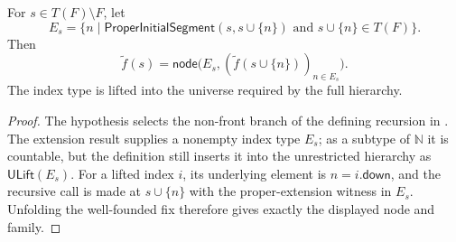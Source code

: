 \begin{lemma}
For $s\in T(F)\setminus F$, let
\[
 E_s=\{n\mid \mathsf{ProperInitialSegment}(s,s\cup\{n\})
                 \text{ and }s\cup\{n\}\in T(F)\}.
\]
Then
\[
 \widetilde f(s)=
 \mathsf{node}\bigl(E_s,(\widetilde f(s\cup\{n\}))_{n\in E_s}\bigr).
\]
The index type is lifted into the universe required by the full hierarchy.
\end{lemma}
\begin{proof}
The hypothesis selects the non-front branch of the defining recursion in
.  The extension result 
supplies a nonempty index type $E_s$; as a subtype of $\mathbb N$ it is
countable, but the definition still inserts it into the unrestricted
hierarchy as $\mathsf{ULift}(E_s)$.  For a lifted index $i$, its underlying
element is $n=i.\mathsf{down}$, and the recursive call is made at
$s\cup\{n\}$ with the proper-extension witness in $E_s$.  Unfolding the
well-founded fix therefore gives exactly the displayed node and family.
\end{proof}
